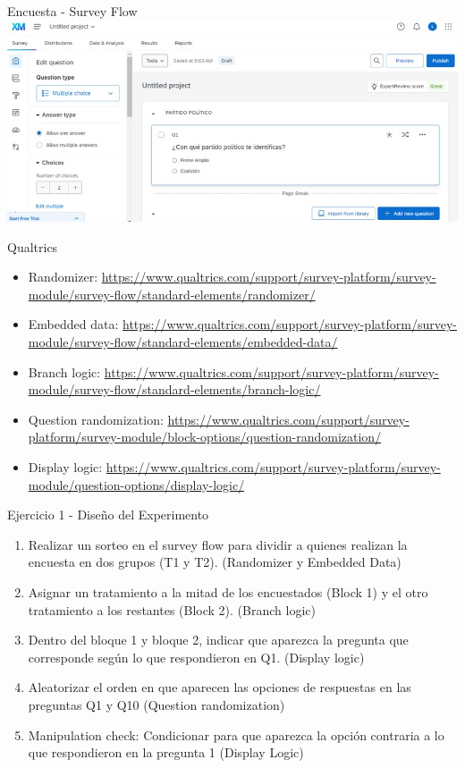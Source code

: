 \documentclass[
  ignorenonframetext,
]{beamer}
\begin{document}
\begin{frame}{Encuesta - Survey Flow}
\protect\hypertarget{encuesta---survey-flow}{}
\includegraphics{figs/Qualtrics_survey flow.jpg}
\end{frame}

\begin{frame}{Qualtrics}
\protect\hypertarget{qualtrics-1}{}
\begin{itemize}
\item
  Randomizer:
  \url{https://www.qualtrics.com/support/survey-platform/survey-module/survey-flow/standard-elements/randomizer/}
\item
  Embedded data:
  \url{https://www.qualtrics.com/support/survey-platform/survey-module/survey-flow/standard-elements/embedded-data/}
\item
  Branch logic:
  \url{https://www.qualtrics.com/support/survey-platform/survey-module/survey-flow/standard-elements/branch-logic/}
\item
  Question randomization:
  \url{https://www.qualtrics.com/support/survey-platform/survey-module/block-options/question-randomization/}
\item
  Display logic:
  \url{https://www.qualtrics.com/support/survey-platform/survey-module/question-options/display-logic/}
\end{itemize}
\end{frame}

\begin{frame}{Ejercicio 1 - Diseño del Experimento}
\protect\hypertarget{ejercicio-1---diseuxf1o-del-experimento}{}
\begin{enumerate}
\item
  Realizar un sorteo en el survey flow para dividir a quienes realizan
  la encuesta en dos grupos (T1 y T2). (Randomizer y Embedded Data)
\item
  Asignar un tratamiento a la mitad de los encuestados (Block 1) y el
  otro tratamiento a los restantes (Block 2). (Branch logic)
\item
  Dentro del bloque 1 y bloque 2, indicar que aparezca la pregunta que
  corresponde según lo que respondieron en Q1. (Display logic)
\item
  Aleatorizar el orden en que aparecen las opciones de respuestas en las
  preguntas Q1 y Q10 (Question randomization)
\item
  Manipulation check: Condicionar para que aparezca la opción contraria
  a lo que respondieron en la pregunta 1 (Display Logic)
\end{enumerate}
\end{frame}
\end{document}
